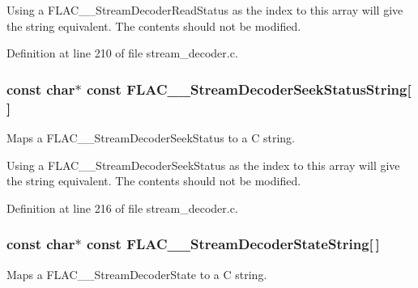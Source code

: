 Using a F\+L\+A\+C\+\_\+\+\_\+\+Stream\+Decoder\+Read\+Status as the index to this array will give the string equivalent. The contents should not be modified. 

Definition at line 210 of file stream\+\_\+decoder.\+c.

\subsubsection[{\texorpdfstring{F\+L\+A\+C\+\_\+\+\_\+\+Stream\+Decoder\+Seek\+Status\+String}{FLAC__StreamDecoderSeekStatusString}}]{ {\bf const} char$\ast$ {\bf const} F\+L\+A\+C\+\_\+\+\_\+\+Stream\+Decoder\+Seek\+Status\+String\mbox{[}$\,$\mbox{]}}\hypertarget{group__flac__stream__decoder_gac793d777a3d5a63e735415b9bea5b20a}{}\label{group__flac__stream__decoder_gac793d777a3d5a63e735415b9bea5b20a}
Maps a F\+L\+A\+C\+\_\+\+\_\+\+Stream\+Decoder\+Seek\+Status to a C string.

Using a F\+L\+A\+C\+\_\+\+\_\+\+Stream\+Decoder\+Seek\+Status as the index to this array will give the string equivalent. The contents should not be modified. 

Definition at line 216 of file stream\+\_\+decoder.\+c.

\subsubsection[{\texorpdfstring{F\+L\+A\+C\+\_\+\+\_\+\+Stream\+Decoder\+State\+String}{FLAC__StreamDecoderStateString}}]{ {\bf const} char$\ast$ {\bf const} F\+L\+A\+C\+\_\+\+\_\+\+Stream\+Decoder\+State\+String\mbox{[}$\,$\mbox{]}}\hypertarget{group__flac__stream__decoder_gae1c6a6fb59fce39e251233fa221fe61d}{}\label{group__flac__stream__decoder_gae1c6a6fb59fce39e251233fa221fe61d}
Maps a F\+L\+A\+C\+\_\+\+\_\+\+Stream\+Decoder\+State to a C string.

